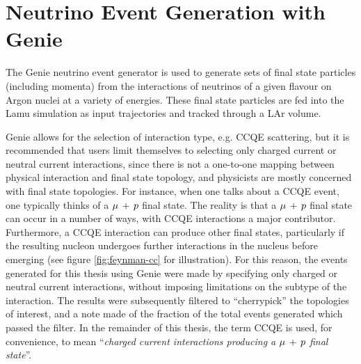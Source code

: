 \section{Neutrino Event Generation with Genie}\label{sec:genie}
The Genie\citep{Genie} neutrino event generator is used to generate sets of final state particles (including momenta) from the interactions of neutrinos of a given flavour on Argon nuclei at a variety of energies. These final state particles are fed into the Lamu simulation as input trajectories and tracked through a \ac{LAr} volume.

Genie allows for the selection of interaction type, e.g. \ac{CCQE} scattering, but it is recommended that users limit themselves to selecting only charged current or neutral current interactions, since there is not a one-to-one mapping between physical interaction and final state topology, and physicists are mostly concerned with final state topologies. For instance, when one talks about a \ac{CCQE} event, one typically thinks of a $\mu\,+\,p$ final state. The reality is that a $\mu\,+\,p$ final state can occur in a number of ways, with \ac{CCQE} interactions a major contributor. Furthermore, a \ac{CCQE} interaction can produce other final states, particularly if the resulting nucleon undergoes further interactions in the nucleus before emerging (see figure \ref{fig:feynman-cc} for illustration). For this reason, the events generated for this thesis using Genie were made by specifying only charged or neutral current interactions, without imposing limitations on the subtype of the interaction. The results were subsequently filtered to ``cherrypick'' the topologies of interest, and a note made of the fraction of the total events generated which passed the filter. In the remainder of this thesis, the term CCQE is used, for convenience, to mean ``\emph{charged current interactions producing a $\mu\,+\,p$ final state}''.


